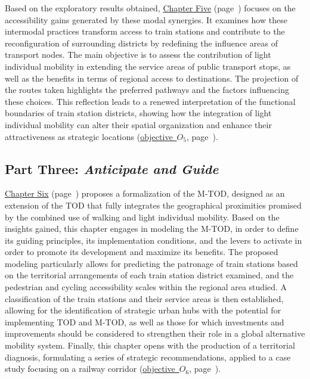 \begin{refsegment}
Based on the exploratory results obtained, \hyperref[chap5:titre]{Chapter Five} (page~\pageref{chap5:titre}) focuses on the accessibility gains generated by these modal synergies. It examines how these intermodal practices transform access to train stations and contribute to the reconfiguration of surrounding districts by redefining the influence areas of transport nodes. The main objective is to assess the contribution of light individual mobility in extending the service areas of public transport stops, as well as the benefits in terms of regional access to destinations. The projection of the routes taken highlights the preferred pathways and the factors influencing these choices. This reflection leads to a renewed interpretation of the functional boundaries of train station districts, showing how the integration of light individual mobility can alter their spatial organization and enhance their attractiveness as strategic locations (\hyperref[objectif-5]{objective~\(O_5\)}, page~\pageref{objectif-5}).%

\subsection*{Part Three: \textsl{Anticipate and Guide}
    \label{introduction-generale:annonce-plan-3}
    }

\hyperref[chap6:titre]{Chapter Six} (page~\pageref{chap6:titre}) proposes a formalization of the \acrshort{M-TOD}, designed as an extension of the \acrshort{TOD} that fully integrates the geographical proximities promised by the combined use of walking and light individual mobility. Based on the insights gained, this chapter engages in modeling the \acrshort{M-TOD}, in order to define its guiding principles, its implementation conditions, and the levers to activate in order to promote its development and maximize its benefits. The proposed modeling particularly allows for predicting the patronage of train stations based on the territorial arrangements of each train station district examined, and the pedestrian and cycling accessibility scales within the regional area studied. A classification of the train stations and their service areas is then established, allowing for the identification of strategic urban hubs with the potential for implementing \acrshort{TOD} and \acrshort{M-TOD}, as well as those for which investments and improvements should be considered to strengthen their role in a global alternative mobility system. Finally, this chapter opens with the production of a territorial diagnosis, formulating a series of strategic recommendations, applied to a case study focusing on a railway corridor (\hyperref[objectif-6]{objective~\(O_6\)}, page~\pageref{objectif-6}).%

    \newpage
    \begingroup
    \renewcommand{\bibfont}{\scriptsize}
\printbibliography[segment=\therefsegment, heading=subbibintoc, title={Bibliography of Introduction}, label=introduction:bibliographie]
    \endgroup
    \end{refsegment}